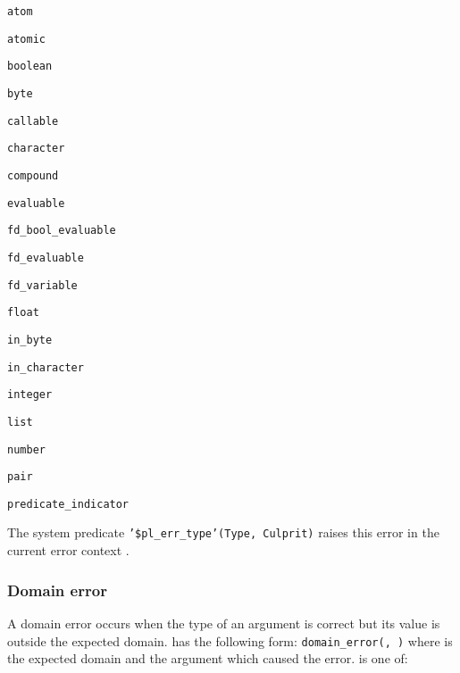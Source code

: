\begin{ItemizeThreeCols}

\item \texttt{atom}

\item \texttt{atomic}

\item \texttt{boolean}

\item \texttt{byte}

\item \texttt{callable}

\item \texttt{character}

\item \texttt{compound}

\item \texttt{evaluable}

\item \texttt{fd\_bool\_evaluable}

\item \texttt{fd\_evaluable}

\item \texttt{fd\_variable}

\item \texttt{float}

\item \texttt{in\_byte}

\item \texttt{in\_character}

\item \texttt{integer}

\item \texttt{list}

\item \texttt{number}

\item \texttt{pair}

\item \texttt{predicate\_indicator}


\end{ItemizeThreeCols}

The system predicate \texttt{'\$pl\_err\_type'(Type, Culprit)} raises this
error in the current error context .

\subsubsection{Domain error}
\label{Domain-error}
A domain error occurs when the type of an argument is correct but its value
is outside the expected domain.  has the
following form: \texttt{domain\_error(, )}
where  is the expected domain and
 the argument which caused the error.
 is one of:

